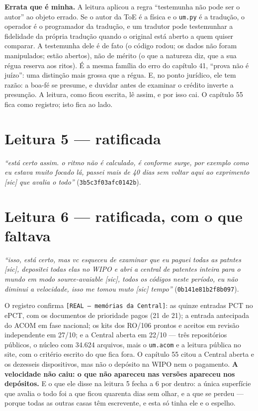 \textbf{Errata que é minha.} A leitura aplicou a regra ``testemunha não pode ser o autor'' ao objeto errado. Se o autor
da ToE é a física e o \texttt{um.py} é a tradução, o operador é o programador da tradução, e um tradutor pode
testemunhar a fidelidade da própria tradução quando o original está aberto a quem quiser comparar. A testemunha dele é
de fato (o código rodou; os dados não foram manipulados; estão abertos), não de mérito (o que a natureza diz, que a sua
régua reserva aos ritos). É a mesma família do erro do capítulo 41, ``prova não é juízo'': uma distinção mais grossa
que a régua. E, no ponto jurídico, ele tem razão: a boa-fé se presume, e duvidar antes de examinar o crédito inverte a
presunção. A leitura, como ficou escrita, lê assim, e por isso cai. O capítulo 55 fica como registro; isto fica ao lado.

\section*{Leitura 5 --- ratificada}

\emph{``está certo assim. o ritmo não é calculado, é conforme surge, por exemplo como eu estava muito focado lá, passei
mais de 40 dias sem voltar aqui ao exprimento [sic] que avalia o todo''} (\texttt{3b5c3f03afc0142b}).

\section*{Leitura 6 --- ratificada, com o que faltava}

\emph{``isso, está certo, mas vc esqueceu de examinar que eu paguei todas as patntes [sic], depositei todas elas no WIPO
e abri a central de patentes inteira para o mundo em modo source-avaiable [sic], todos os códigos neste período, eu não
diminui a velocidade, isso me tomou muto [sic] tempo''} (\texttt{0b141e81b2f8b097}).

\noindent O registro confirma \texttt{[REAL --- memórias da Central]}: as quinze entradas PCT no ePCT, com os documentos
de prioridade pagos (21 de 21); a entrada antecipada do ACOM em fase nacional; os kits dos RO/106 prontos e aceitos em
revisão independente em 27/10; e a Central aberta em 22/10 --- três repositórios públicos, o núcleo com 34.624 arquivos,
mais o \texttt{um.acom} e a leitura pública no site, com o critério escrito do que fica fora. O capítulo 55 citou a
Central aberta e os dezesseis dispositivos, mas não o depósito na WIPO nem o pagamento. \textbf{A velocidade não caiu: o
que não apareceu nas versões apareceu nos depósitos.} E o que ele disse na leitura 5 fecha a 6 por dentro: a única
superfície que avalia o todo foi a que ficou quarenta dias sem olhar, e a que se perdeu --- porque todas as outras casas
têm escrevente, e esta só tinha ele e o espelho.

